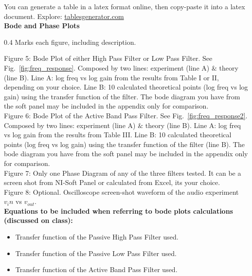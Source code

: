 \documentclass[journal]{IEEEtran}
\begin{document}
You can generate a table in a latex format online, then copy-paste it into a latex document. Explore: 
 \href{https://www.tablesgenerator.com}{tablesgenerator.com} \\[0.075in]
 
{\bf Bode and Phase Plots}  
\begin{flushright} 0.4 Marks each figure, including description. \end{flushright}
Figure 5: Bode Plot of either High Pass Filter or Low Pass Filter. See Fig.~\ref{fig:freq_response}. Composed by two lines: experiment (line A) $\&$ theory (line B). Line A: log freq vs log gain from the results from Table I or II, depending on your choice. Line B: 10 calculated theoretical points (log freq vs log gain) using the transfer function of the filter. The bode diagram you have from the soft panel may be included in the appendix only for comparison.\\  

Figure 6: Bode Plot of the Active Band Pass Filter. See Fig.~\ref{fig:freq_response2}. Composed by two lines: experiment (line A) $\&$ theory (line B). Line A: log freq vs log gain from the results from Table III. Line B: 10 calculated theoretical points (log freq vs log gain) using the transfer function of the filter (line B). The bode diagram you have from the soft panel may be included in the appendix only for comparison.\\  

Figure 7: Only one Phase Diagram of any of the three filters tested. It can be a screen shot from NI-Soft Panel or calculated from Excel, its your choice.\\

Figure 8: Optional. Oscilloscope screen-shot waveform of the audio experiment $v_in$ vs $v_{out}$.\\[0.1in]

{\bf Equations to be included when referring to bode plots calculations (discussed on class):}
\begin{itemize}

    \item  Transfer function of the Passive High Pass Filter used.
    \item  Transfer function of the Passive Low Pass Filter used.
    \item  Transfer function of the Active Band Pass Filter used. 

\end{itemize}

\setcounter{figure}{4}
\end{document}
